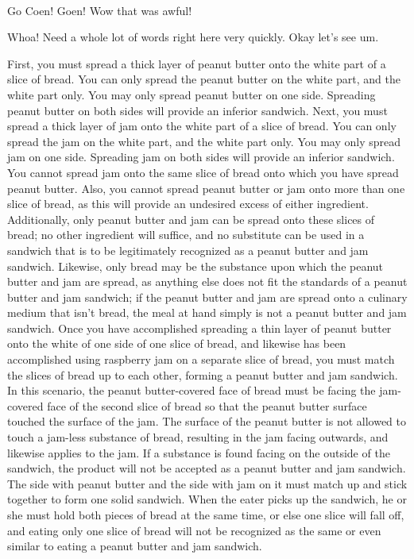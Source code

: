 \documentclass[a4paper, titlepage, oneside]{article}
\begin{document}
\begin{multicols}{2}
\paragraph{}
Go Coen! Goen! Wow that was awful!

Whoa! Need a whole lot of words right here very quickly. Okay let's see um.

First, you must spread a thick layer of peanut butter onto the white part of a slice of bread. You can only spread the peanut butter on the white part, and the white part only. You may only spread peanut butter on one side. Spreading peanut butter on both sides will provide an inferior sandwich. Next, you must spread a thick layer of jam onto the white part of a slice of bread. You can only spread the jam on the white part, and the white part only. You may only spread jam on one side. Spreading jam on both sides will provide an inferior sandwich. You cannot spread jam onto the same slice of bread onto which you have spread peanut butter. Also, you cannot spread peanut butter or jam onto more than one slice of bread, as this will provide an undesired excess of either ingredient. Additionally, only peanut butter and jam can be spread onto these slices of bread; no other ingredient will suffice, and no substitute can be used in a sandwich that is to be legitimately recognized as a peanut butter and jam sandwich. Likewise, only bread may be the substance upon which the peanut butter and jam are spread, as anything else does not fit the standards of a peanut butter and jam sandwich; if the peanut butter and jam are spread onto a culinary medium that isn’t bread, the meal at hand simply is not a peanut butter and jam sandwich. Once you have accomplished spreading a thin layer of peanut butter onto the white of one side of one slice of bread, and likewise has been accomplished using raspberry jam on a separate slice of bread, you must match the slices of bread up to each other, forming a peanut butter and jam sandwich. In this scenario, the peanut butter-covered face of bread must be facing the jam-covered face of the second slice of bread so that the peanut butter surface touched the surface of the jam. The surface of the peanut butter is not allowed to touch a jam-less substance of bread, resulting in the jam facing outwards, and likewise applies to the jam. If a substance is found facing on the outside of the sandwich, the product will not be accepted as a peanut butter and jam sandwich. The side with peanut butter and the side with jam on it must match up and stick together to form one solid sandwich. When the eater picks up the sandwich, he or she must hold both pieces of bread at the same time, or else one slice will fall off, and eating only one slice of bread will not be recognized as the same or even similar to eating a peanut butter and jam sandwich.


\end{multicols}
\end{document}
